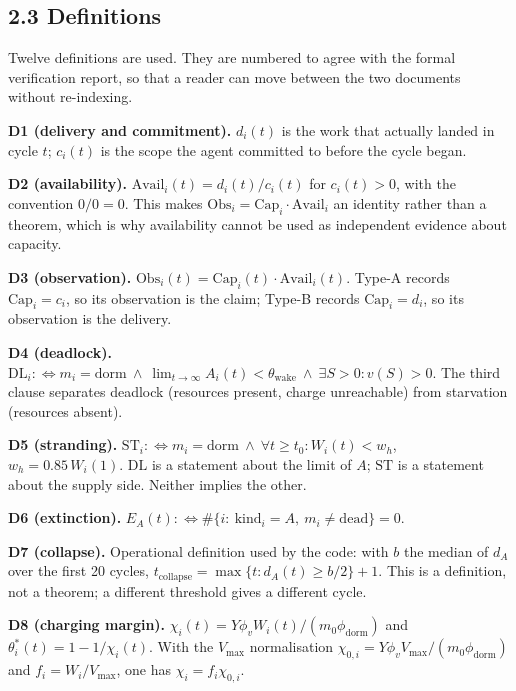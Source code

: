 \documentclass[11pt,a4paper]{article}
\begin{document}
\subsection{2.3 Definitions}\label{definitions}

Twelve definitions are used. They are numbered to agree with the formal
verification report, so that a reader can move between the two documents without
re-indexing.

\textbf{D1 (delivery and commitment).} \(d_i(t)\) is the work that actually landed in
cycle \(t\); \(c_i(t)\) is the scope the agent committed to before the cycle began.

\textbf{D2 (availability).} \(\mathrm{Avail}_i(t)=d_i(t)/c_i(t)\) for \(c_i(t)>0\), with
the convention \(0/0=0\). This makes
\(\mathrm{Obs}_i=\mathrm{Cap}_i\cdot\mathrm{Avail}_i\) an identity rather than a
theorem, which is why availability cannot be used as independent evidence about
capacity.

\textbf{D3 (observation).} \(\mathrm{Obs}_i(t)=\mathrm{Cap}_i(t)\cdot\mathrm{Avail}_i(t)\).
Type-A records \(\mathrm{Cap}_i=c_i\), so its observation is the claim; Type-B
records \(\mathrm{Cap}_i=d_i\), so its observation is the delivery.

\textbf{D4 (deadlock).} \(\mathrm{DL}_i:\iff m_i=\mathrm{dorm}\ \land\
\lim_{t\to\infty}A_i(t)<\theta_{\mathrm{wake}}\ \land\ \exists S>0:v(S)>0\).
The third clause separates deadlock (resources present, charge unreachable) from
starvation (resources absent).

\textbf{D5 (stranding).} \(\mathrm{ST}_i:\iff m_i=\mathrm{dorm}\ \land\
\forall t\ge t_0:W_i(t)<w_h\), \(w_h=0.85\,W_i(1)\). \(\mathrm{DL}\) is a statement
about the limit of \(A\); \(\mathrm{ST}\) is a statement about the supply side. Neither
implies the other.

\textbf{D6 (extinction).} \(E_A(t):\iff\#\{i:\ \mathrm{kind}_i=A,\ m_i\ne
\mathrm{dead}\}=0\).

\textbf{D7 (collapse).} Operational definition used by the code: with \(b\) the median
of \(d_A\) over the first 20 cycles,
\(t_{\mathrm{collapse}}=\max\{t:d_A(t)\ge b/2\}+1\). This is a definition, not a
theorem; a different threshold gives a different cycle.

\textbf{D8 (charging margin).} \(\chi_i(t)=Y\phi_vW_i(t)/(m_0\phi_{\mathrm{dorm}})\) and
\(\theta^\ast_i(t)=1-1/\chi_i(t)\). With the \(V_{\max}\) normalisation
\(\chi_{0,i}=Y\phi_vV_{\max}/(m_0\phi_{\mathrm{dorm}})\) and \(f_i=W_i/V_{\max}\),
one has \(\chi_i=f_i\chi_{0,i}\).
\end{document}
